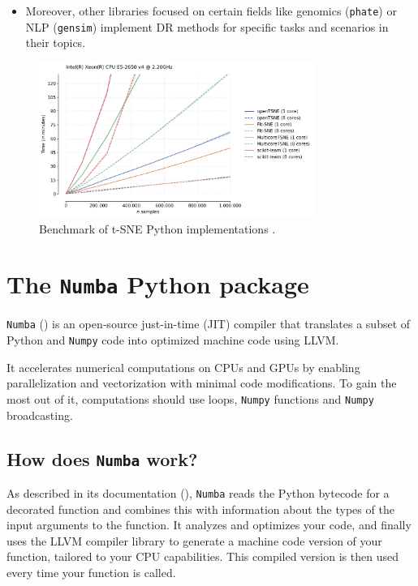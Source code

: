 \documentclass[a4paper,12pt]{article}
\begin{document}
\begin{itemize}
\begin{itemize}
    \end{itemize}
    \item Moreover, other libraries focused on certain fields like genomics (\texttt{phate}) or NLP (\texttt{gensim}) implement DR methods for specific tasks and scenarios in their topics.
\end{itemize}

\begin{figure}[ht]
    \centering
    \includegraphics[width=0.8\textwidth]{figures/python_tsne_benchmarks.png}
    \caption{Benchmark of t-SNE Python implementations \cite{Policar2024}.}
    \label{fig:python_tsne_benchmarks}
\end{figure}

\pagebreak
\section{The \texttt{Numba} Python package}
\label{sec:Numba}

\texttt{Numba} (\cite{Lam2015}) is an open‐source just-in-time (JIT) compiler that translates a subset of Python and \texttt{Numpy} code into optimized machine code using LLVM.

It accelerates numerical computations on CPUs and GPUs by enabling parallelization and vectorization with minimal code modifications. To gain the most out of it, computations should use loops, \texttt{Numpy} functions and \texttt{Numpy} broadcasting.

\subsection{How does \texttt{Numba} work?}

As described in its documentation (\cite{Lam2015}), \texttt{Numba} reads the Python bytecode for a decorated function and combines this with information about the types of the input arguments to the function. It analyzes and optimizes your code, and finally uses the LLVM compiler library to generate a machine code version of your function, tailored to your CPU capabilities. This compiled version is then used every time your function is called.
\end{document}
